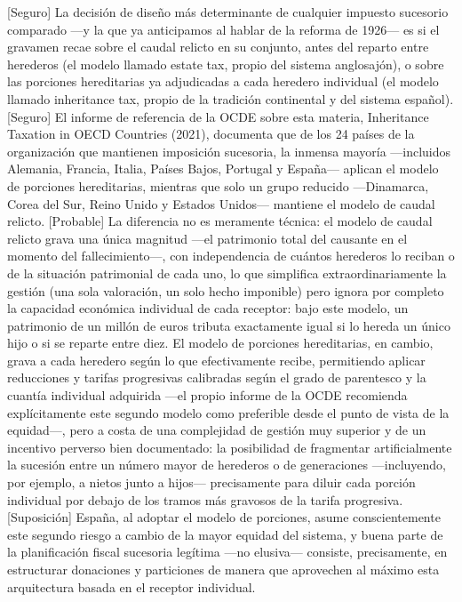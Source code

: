\documentclass[10pt,a4paper]{article}
\begin{document}
[Seguro] La decisión de diseño más determinante de cualquier impuesto sucesorio comparado —y la que ya anticipamos al hablar de la reforma de 1926— es si el gravamen recae sobre el caudal relicto en su conjunto, antes del reparto entre herederos (el modelo llamado estate tax, propio del sistema anglosajón), o sobre las porciones hereditarias ya adjudicadas a cada heredero individual (el modelo llamado inheritance tax, propio de la tradición continental y del sistema español). [Seguro] El informe de referencia de la OCDE sobre esta materia, Inheritance Taxation in OECD Countries (2021), documenta que de los 24 países de la organización que mantienen imposición sucesoria, la inmensa mayoría —incluidos Alemania, Francia, Italia, Países Bajos, Portugal y España— aplican el modelo de porciones hereditarias, mientras que solo un grupo reducido —Dinamarca, Corea del Sur, Reino Unido y Estados Unidos— mantiene el modelo de caudal relicto. [Probable] La diferencia no es meramente técnica: el modelo de caudal relicto grava una única magnitud —el patrimonio total del causante en el momento del fallecimiento—, con independencia de cuántos herederos lo reciban o de la situación patrimonial de cada uno, lo que simplifica extraordinariamente la gestión (una sola valoración, un solo hecho imponible) pero ignora por completo la capacidad económica individual de cada receptor: bajo este modelo, un patrimonio de un millón de euros tributa exactamente igual si lo hereda un único hijo o si se reparte entre diez. El modelo de porciones hereditarias, en cambio, grava a cada heredero según lo que efectivamente recibe, permitiendo aplicar reducciones y tarifas progresivas calibradas según el grado de parentesco y la cuantía individual adquirida —el propio informe de la OCDE recomienda explícitamente este segundo modelo como preferible desde el punto de vista de la equidad—, pero a costa de una complejidad de gestión muy superior y de un incentivo perverso bien documentado: la posibilidad de fragmentar artificialmente la sucesión entre un número mayor de herederos o de generaciones —incluyendo, por ejemplo, a nietos junto a hijos— precisamente para diluir cada porción individual por debajo de los tramos más gravosos de la tarifa progresiva. [Suposición] España, al adoptar el modelo de porciones, asume conscientemente este segundo riesgo a cambio de la mayor equidad del sistema, y buena parte de la planificación fiscal sucesoria legítima —no elusiva— consiste, precisamente, en estructurar donaciones y particiones de manera que aprovechen al máximo esta arquitectura basada en el receptor individual.
\end{document}
